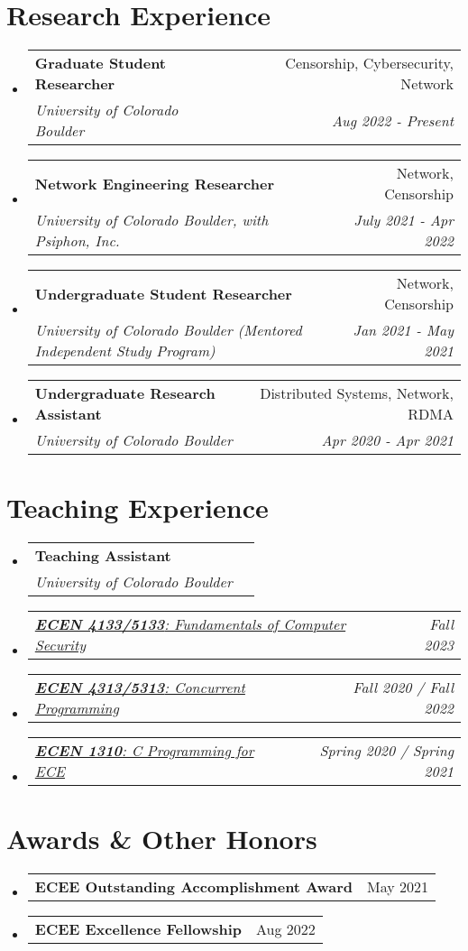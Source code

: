 \documentclass[letterpaper,11pt]{article}
\makeatletter
\newcommand{\resumeSubheading}[4]{
  \vspace{-2pt}\item
    \begin{tabular*}{0.97\textwidth}[t]{l@{\extracolsep{\fill}}r}
      \textbf{#1} & #2 \\
      \textit{\small#3} & \textit{\small #4} \\
    \end{tabular*}\vspace{-7pt}
}
\newcommand{\resumeSubSubheading}[2]{
    \item
    \begin{tabular*}{0.97\textwidth}{l@{\extracolsep{\fill}}r}
      \textit{\small#1} & \textit{\small #2} \\
    \end{tabular*}\vspace{-7pt}
}
\newcommand{\resumeProjectHeading}[2]{
    \item
    \begin{tabular*}{0.97\textwidth}{l@{\extracolsep{\fill}}r}
      \small#1 & #2 \\
    \end{tabular*}\vspace{-7pt}
}
\newcommand{\resumeSubHeadingListStart}{\begin{itemize}[leftmargin=0.15in, label={}]}
\newcommand{\resumeSubHeadingListEnd}{\end{itemize}}
\makeatother
\begin{document}
\section{Research Experience}
\resumeSubHeadingListStart
\resumeSubheading
{Graduate Student Researcher}{Censorship, Cybersecurity, Network}
{University of Colorado Boulder}{Aug 2022 - Present}
\resumeSubheading
{Network Engineering Researcher}{Network, Censorship}
{University of Colorado Boulder, with Psiphon, Inc.}{July 2021 - Apr 2022}
\resumeSubheading
{Undergraduate Student Researcher}{Network, Censorship}
{University of Colorado Boulder (Mentored Independent Study Program)}{Jan 2021 - May 2021}
\resumeSubheading
{Undergraduate Research Assistant}{Distributed Systems, Network, RDMA}
{University of Colorado Boulder}{Apr 2020 - Apr 2021}
\resumeSubHeadingListEnd
\vspace{1pt}

\section{Teaching Experience}
\resumeSubHeadingListStart
\resumeSubheading
{Teaching Assistant}{}
{University of Colorado Boulder}{}
\resumeSubSubheading
{
  \em\href{https://experts.colorado.edu/display/coursename_ECEN-5133}{\textbf{ECEN 4133/5133}: Fundamentals of Computer Security}
}{Fall 2023}
\resumeSubSubheading
{
  \em\href{https://experts.colorado.edu/display/coursename_ECEN-5313}{\textbf{ECEN 4313/5313}: Concurrent Programming}
}{Fall 2020 / Fall 2022}
\resumeSubSubheading
{
  \em\href{https://experts.colorado.edu/display/coursename_ECEN-1310}{\textbf{ECEN 1310}: C Programming for ECE}
}{Spring 2020 / Spring 2021}
\resumeSubHeadingListEnd
\vspace{1pt}

\section{Awards \& Other Honors}
\resumeSubHeadingListStart
  \resumeProjectHeading {\textbf{ECEE Outstanding Accomplishment Award}}{May 2021}
  \resumeProjectHeading {\textbf{ECEE Excellence Fellowship}}{Aug 2022}
\resumeSubHeadingListEnd
\vspace{1pt}

\end{document}
